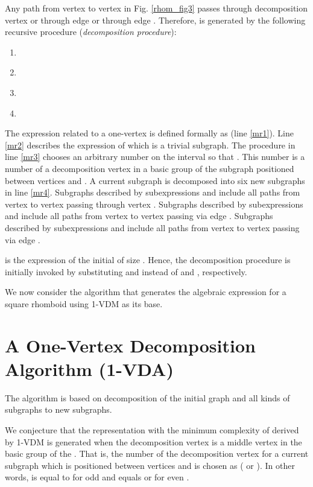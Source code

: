 \documentclass[11pt]{article}\usepackage{amsmath}
\begin{document}
Any path from vertex  to vertex  in Fig. \ref{rhom_fig3} passes through
decomposition vertex  or through edge  or through edge .
Therefore,  is generated by the following recursive procedure
(\textit{decomposition procedure}):

\begin{enumerate}
\item \label{mr1} 

\item \label{mr2} 

\item \label{mr3} 

\item \label{mr4}


\end{enumerate}

The expression related to a one-vertex  is defined formally as  (line
\ref{mr1}). Line \ref{mr2} describes the expression of  which is a
trivial subgraph. The procedure  in line \ref{mr3}
chooses an arbitrary number  on the interval  so that . This
number is a number of a decomposition vertex in a basic group of the 
subgraph positioned between vertices  and . A current subgraph is
decomposed into six new subgraphs in line \ref{mr4}. Subgraphs described by
subexpressions  and  include all paths from vertex  to
vertex  passing through vertex . Subgraphs described by subexpressions
 and  include all paths from vertex
 to vertex  passing via edge . Subgraphs described by
subexpressions  and  include all
paths from vertex  to vertex  passing via edge .

 is the expression of the initial  of size . Hence, the
decomposition procedure is initially invoked by substituting  and 
instead of  and , respectively.

We now consider the algorithm that generates the algebraic expression for a
square rhomboid using 1-VDM as its base.

\section{A One-Vertex Decomposition Algorithm (1-VDA)}

The algorithm is based on decomposition of the initial graph and all kinds of
subgraphs to new subgraphs.

We conjecture that the representation with the minimum complexity of 
derived by 1-VDM is generated when the decomposition vertex is a middle vertex
in the basic group of the . That is, the number  of the decomposition
vertex for a current  subgraph which is positioned between vertices 
and  is chosen as  (
or ). In other words,  is equal
to  for odd  and  equals  or
 for even .
\end{document}
